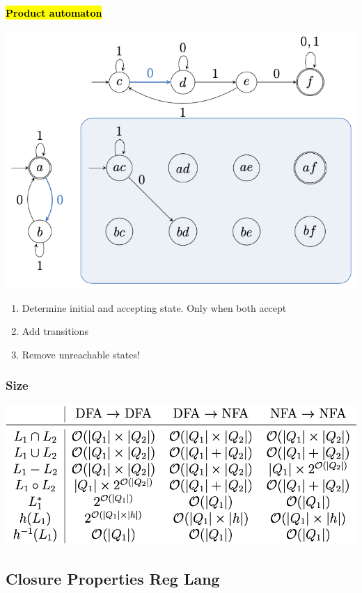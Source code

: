 \documentclass[a3paper, 8pt]{extarticle}
\begin{document}
\begin{multicols*}{6}
\paragraph{\hl{Product automaton}}
\begin{center}
    \includegraphics[width=0.9\columnwidth]{images/Screen Shot 2023-01-11 at 14.21.54.png}
\end{center} \begin{enumerate}
    \item Determine initial and accepting state. Only when both accept
    \item Add transitions
    \item Remove unreachable states!
\end{enumerate}


\subsubsection{Size}
\begin{center}
    \includegraphics[width=0.97\columnwidth]{images/Screen Shot 2023-01-12 at 15.29.59.png}
\end{center}
\subsection{Closure Properties Reg Lang}


\end{multicols*}
\end{document}
